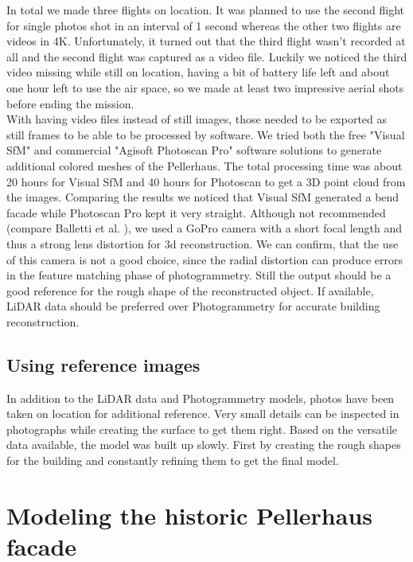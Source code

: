 In total we made three flights on location. It was planned to use the second flight for single photos shot in an interval of 1 second whereas the other two flights are videos in 4K. Unfortunately, it turned out that the third flight wasn't recorded at all and the second flight was captured as a video file. Luckily we noticed the third video missing while still on location, having a bit of battery life left and about one hour left to use the air space, so we made at least two impressive aerial shots before ending the mission.\\

With having video files instead of still images, those needed to be exported as still frames to be able to be processed by software. We tried both the free "Visual SfM" and commercial "Agisoft Photoscan Pro" software solutions to generate additional colored meshes of the Pellerhaus. The total processing time was about 20 hours for Visual SfM and 40 hours for Photoscan to get a 3D point cloud from the images. Comparing the results we noticed that Visual SfM generated a bend facade while Photoscan Pro kept it very straight. Although not recommended (compare Balletti et al. \parencite{calibration_of_action_cameras}), we used a GoPro camera with a short focal length and thus a strong lens distortion for 3d reconstruction. We can confirm, that the use of this camera is not a good choice, since the radial distortion can produce errors in the feature matching phase of photogrammetry. Still the output should be a good reference for the rough shape of the reconstructed object. If available, LiDAR data should be preferred over Photogrammetry for accurate building reconstruction.

\subsection{Using reference images}

In addition to the LiDAR data and Photogrammetry models, photos have been taken on location for additional reference. Very small details can be inspected in photographs while creating the surface to get them right. Based on the versatile data available, the model was built up slowly. First by creating the rough shapes for the building and constantly refining them to get the final model.

\pagebreak

\section{Modeling the historic Pellerhaus facade}

